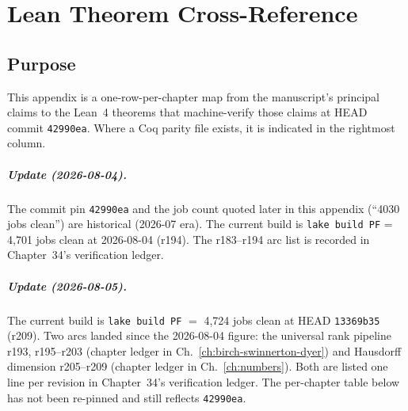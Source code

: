 \chapter{Lean Theorem Cross-Reference}
\label{app:lean-cross-reference}

\section{Purpose}
\label{sec:lean-cross-reference-purpose}

This appendix is a one-row-per-chapter map from the manuscript's
principal claims to the Lean~4 theorems that machine-verify those
claims at HEAD commit \texttt{42990ea}. Where a Coq parity file
exists, it is indicated in the rightmost column.

\paragraph{Update (2026-08-04).} The commit pin \texttt{42990ea} and
the job count quoted later in this appendix
(``4030 jobs clean'') are historical (2026-07 era). The current
build is \texttt{lake build PF} = 4{,}701 jobs clean at 2026-08-04
(r194). The r183--r194 arc list is recorded in Chapter~34's
verification ledger.

\paragraph{Update (2026-08-05).} The current build is
\texttt{lake build PF} $=$ 4{,}724 jobs clean at HEAD
\texttt{13369b35} (r209). Two arcs landed since the 2026-08-04
figure: the universal rank pipeline r193, r195--r203 (chapter
ledger in Ch.~\ref{ch:birch-swinnerton-dyer}) and Hausdorff
dimension r205--r209 (chapter ledger in Ch.~\ref{ch:numbers}).
Both are listed one line per revision in Chapter~34's
verification ledger. The per-chapter table below has not been
re-pinned and still reflects \texttt{42990ea}.

